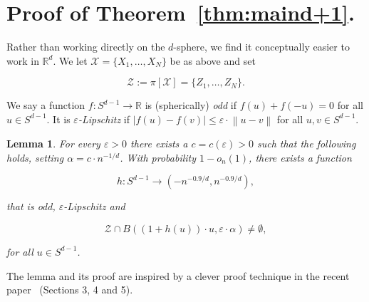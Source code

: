 \documentclass[11pt]{article}%
\newtheorem{lemma}[lemma]{Lemma}
\newcommand{\Xcal}[0]{\ensuremath{{\mathcal X}}}
\newcommand{\Zcal}[0]{\ensuremath{{\mathcal Z}}}
\newcommand{\eR}[0]{\ensuremath{ \mathbb R}}
\newcommand{\norm}[1]{\ensuremath{\left\|#1\right\|}}
\newcommand{\eps}{\varepsilon}
\begin{document}
\section{Proof of Theorem~\ref{thm:maind+1}.\label{sec:maind+1}}

Rather than working directly on the $d$-sphere, we find it conceptually easier to 
work in $\eR^d$.
%
%
%
We let $\Xcal = \{X_1,\dots,X_N\}$ be as above and set 

$$   \Zcal := \pi[\Xcal] = \{Z_1,\dots,Z_N\}. $$

We say a function $f : S^{d-1} \to \eR$ is (spherically) {\em odd} if $f(u)+f(-u)=0$ for all $u \in S^{d-1}$.
It is {\em $\eps$-Lipschitz} if $|f(u)-f(v)| \leq \eps \cdot \norm{u-v}$ for all $u,v \in S^{d-1}$.

\begin{lemma}\label{lem:embed}
For every $\eps >0$ there exists a $c=c(\eps)>0$ such that the following holds, 
setting $\alpha = c \cdot n^{-1/d}$.
With probability $1-o_n(1)$, there exists a function 

$$ h : S^{d-1} \to \left(-n^{-0.9/d},n^{-0.9/d}\right),$$ 

\noindent
that is odd, $\eps$-Lipschitz and  

$$ \Zcal \cap B\left( (1+h(u))\cdot u, \eps\cdot\alpha \right) \neq \emptyset,$$ 

\noindent 
for all $u \in S^{d-1}$.
\end{lemma}

The lemma and its proof are inspired by a clever proof technique in the recent paper~\cite{BalisterEtal} (Sections 3, 4 and 5).
\end{document}
